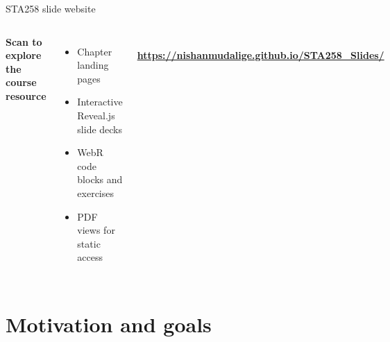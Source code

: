\documentclass[aspectratio=169,10pt]{beamer}
\begin{document}
\begin{frame}{STA258 slide website}
\vspace{1.0em}
\begin{columns}[T,onlytextwidth]
\vspace{0.6em}
{\Large\bfseries\color{UTBlue} Scan to explore the course resource}

\vspace{0.85em}
\begin{itemize}
  \item Chapter landing pages
  \item Interactive Reveal.js slide decks
  \item WebR code blocks and exercises
  \item PDF views for static access
\end{itemize}

\vspace{0.1em}
\begin{center}
\\[0.5em]
{\small\bfseries\url{https://nishanmudalige.github.io/STA258_Slides/}}
\end{center}
\end{columns}
\end{frame}

\section{Motivation and goals}
\end{document}
